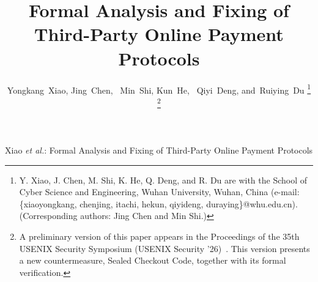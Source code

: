 \documentclass[journal]{IEEEtran}
\begin{document}

\title{Formal Analysis and Fixing of Third-Party Online Payment Protocols}

\author{Yongkang~Xiao,
        Jing~Chen,~
        Min~Shi,
        Kun~He,~
        Qiyi~Deng,
        and~Ruiying~Du%
\thanks{Y. Xiao, J. Chen, M. Shi, K. He, Q. Deng, and R. Du are with the School of Cyber Science and Engineering, Wuhan University, Wuhan, China (e-mail: \{xiaoyongkang, chenjing, itachi, hekun, qiyideng, duraying\}@whu.edu.cn). (Corresponding authors: Jing Chen and Min Shi.)}%
\thanks{A preliminary version of this paper appears in the Proceedings of the 35th USENIX Security Symposium (USENIX Security '26)~\cite{xiao2026authorization}. This version presents a new countermeasure, Sealed Checkout Code, together with its formal verification.}}

%
{Xiao \MakeLowercase{\textit{et al.}}: Formal Analysis and Fixing of Third-Party Online Payment Protocols}

\maketitle
\end{document}
